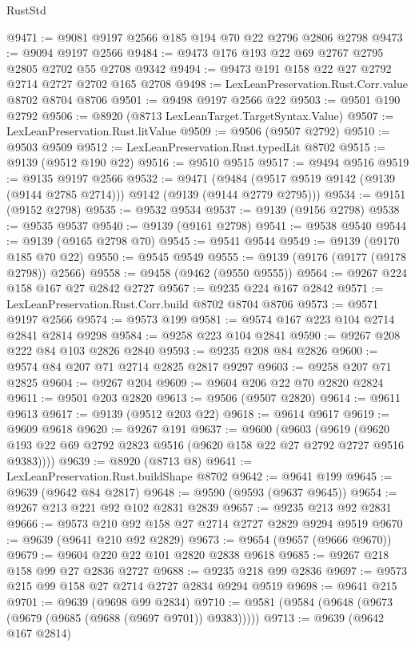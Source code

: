 \begin{lexlean}{RustStd}
\begin{coremodule}
@9471 := @9081 @9197 @2566 @185 @194 @70 @22 @2796 @2806 @2798
@9473 := @9094 @9197 @2566
@9484 := @9473 @176 @193 @22 @69 @2767 @2795 @2805 @2702 @55 @2708 @9342
@9494 := @9473 @191 @158 @22 @27 @2792 @2714 @2727 @2702 @165 @2708
@9498 := LexLeanPreservation.Rust.Corr.value @8702 @8704 @8706
@9501 := @9498 @9197 @2566 @22
@9503 := @9501 @190 @2792
@9506 := @8920 (@8713 LexLeanTarget.TargetSyntax.Value)
@9507 := LexLeanPreservation.Rust.litValue
@9509 := @9506 (@9507 @2792)
@9510 := @9503 @9509
@9512 := LexLeanPreservation.Rust.typedLit @8702
@9515 := @9139 (@9512 @190 @22)
@9516 := @9510 @9515
@9517 := @9494 @9516
@9519 := @9135 @9197 @2566
@9532 := @9471
    (@9484 (@9517 @9519 @9142 (@9139 (@9144 @2785 @2714))) @9142 (@9139 (@9144 @2779 @2795)))
@9534 := @9151 (@9152 @2798)
@9535 := @9532 @9534
@9537 := @9139 (@9156 @2798)
@9538 := @9535 @9537
@9540 := @9139 (@9161 @2798)
@9541 := @9538 @9540
@9544 := @9139 (@9165 @2798 @70)
@9545 := @9541 @9544
@9549 := @9139 (@9170 @185 @70 @22)
@9550 := @9545 @9549
@9555 := @9139 (@9176 (@9177 (@9178 @2798)) @2566)
@9558 := @9458 (@9462 (@9550 @9555))
@9564 := @9267 @224 @158 @167 @27 @2842 @2727
@9567 := @9235 @224 @167 @2842
@9571 := LexLeanPreservation.Rust.Corr.build @8702 @8704 @8706
@9573 := @9571 @9197 @2566
@9574 := @9573 @199
@9581 := @9574 @167 @223 @104 @2714 @2841 @2814 @9298
@9584 := @9258 @223 @104 @2841
@9590 := @9267 @208 @222 @84 @103 @2826 @2840
@9593 := @9235 @208 @84 @2826
@9600 := @9574 @84 @207 @71 @2714 @2825 @2817 @9297
@9603 := @9258 @207 @71 @2825
@9604 := @9267 @204
@9609 := @9604 @206 @22 @70 @2820 @2824
@9611 := @9501 @203 @2820
@9613 := @9506 (@9507 @2820)
@9614 := @9611 @9613
@9617 := @9139 (@9512 @203 @22)
@9618 := @9614 @9617
@9619 := @9609 @9618
@9620 := @9267 @191
@9637 := @9600
    (@9603
      (@9619 (@9620 @193 @22 @69 @2792 @2823 @9516 (@9620 @158 @22 @27 @2792 @2727 @9516 @9383))))
@9639 := @8920 (@8713 @8)
@9641 := LexLeanPreservation.Rust.buildShape @8702
@9642 := @9641 @199
@9645 := @9639 (@9642 @84 @2817)
@9648 := @9590 (@9593 (@9637 @9645))
@9654 := @9267 @213 @221 @92 @102 @2831 @2839
@9657 := @9235 @213 @92 @2831
@9666 := @9573 @210 @92 @158 @27 @2714 @2727 @2829 @9294 @9519
@9670 := @9639 (@9641 @210 @92 @2829)
@9673 := @9654 (@9657 (@9666 @9670))
@9679 := @9604 @220 @22 @101 @2820 @2838 @9618
@9685 := @9267 @218 @158 @99 @27 @2836 @2727
@9688 := @9235 @218 @99 @2836
@9697 := @9573 @215 @99 @158 @27 @2714 @2727 @2834 @9294 @9519
@9698 := @9641 @215
@9701 := @9639 (@9698 @99 @2834)
@9710 := @9581 (@9584 (@9648 (@9673 (@9679 (@9685 (@9688 (@9697 @9701)) @9383)))))
@9713 := @9639 (@9642 @167 @2814)

\end{coremodule}
\end{lexlean}
